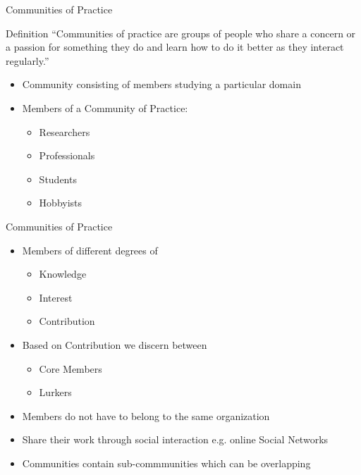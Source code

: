 \begin{frame}{Communities of Practice}
  \begin{block}{Definition}
    ``Communities of practice are groups of people who share a concern or a
    passion for something they do and learn how to do it better as they interact regularly.'' \cite{Weng98}
  \end{block}
  \begin{itemize}
    \item Community consisting of members studying a particular domain
    \item Members of a Community of Practice:
          \begin{itemize}
            \item Researchers
            \item Professionals
            \item Students
            \item Hobbyists
          \end{itemize} %
  \end{itemize}
\end{frame}


\begin{frame}{Communities of Practice}
  \begin{itemize}
    \item Members of different degrees of
          \begin{itemize}
            \item Knowledge %
            \item Interest %
            \item Contribution
          \end{itemize}
    \item Based on Contribution we discern between
          \begin{itemize}
            \item Core Members %
            \item Lurkers %
          \end{itemize}
    \item Members do not have to belong to the same organization
    \item Share their work through social interaction e.g. online Social Networks %
    \item Communities contain sub-commmunities which can be overlapping
  \end{itemize}
\end{frame}

